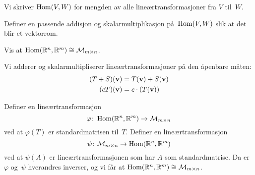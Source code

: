 



\begin{oppgave}
Vi skriver $\operatorname{Hom}(V,W)$ for mengden av alle lineærtransformasjoner fra
$V$ til~$W$.
\begin{punkt}
Definer en passende addisjon og skalarmultiplikasjon på~$\operatorname{Hom}(V,W)$
slik at det blir et vektorrom.
\end{punkt}
\begin{punkt}
Vis at $\operatorname{Hom}(\mathbb{R}^n, \mathbb{R}^m) \cong \mathcal{M}_{m \times n}$.
\end{punkt}
\end{oppgave}

\begin{losning}
\begin{punkt}
Vi adderer og skalarmultipliserer lineærtransformasjoner på den
åpenbare måten:
\begin{align*}
(T + S)(\mathbf{v}) &= T(\mathbf{v}) + S(\mathbf{v}) \\
(cT)(\mathbf{v}) &= c \cdot (T(\mathbf{v}))
\end{align*}
\end{punkt}
\begin{punkt}
Definer en lineærtransformasjon
\[
\varphi \colon \operatorname{Hom}(\mathbb{R}^n, \mathbb{R}^m) \to \mathcal{M}_{m \times n}
\]
ved at $\varphi(T)$ er standardmatrisen til~$T$.  Definer en
lineærtransformasjon
\[
\psi \colon \mathcal{M}_{m \times n} \to \operatorname{Hom}(\mathbb{R}^n, \mathbb{R}^m)
\]
ved at $\psi(A)$ er lineærtransformasjonen som har $A$ som
standardmatrise.  Da er $\varphi$ og~$\psi$ hverandres inverser, og vi
får at $\operatorname{Hom}(\mathbb{R}^n, \mathbb{R}^m) \cong \mathcal{M}_{m \times n}$.
\end{punkt}
\end{losning}




